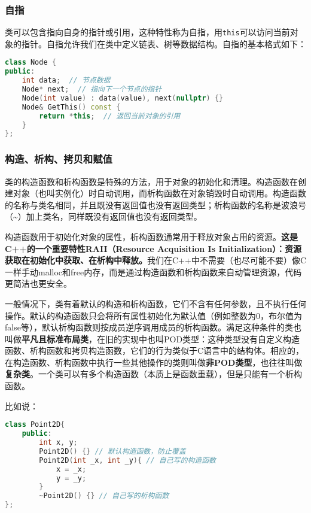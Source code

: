 \documentclass[../main.tex]{subfiles}
\begin{document}
\subsubsection{自指}

类可以包含指向自身的指针或引用，这种特性称为自指，用\texttt{this}可以访问当前对象的指针。自指允许我们在类中定义链表、树等数据结构。自指的基本格式如下：
\begin{lstlisting}[language=C++]
class Node {
public:
    int data;  // 节点数据
    Node* next;  // 指向下一个节点的指针
    Node(int value) : data(value), next(nullptr) {}
    Node& GetThis() const {
        return *this;  // 返回当前对象的引用
    }
};
\end{lstlisting}

\subsubsection{构造、析构、拷贝和赋值}

类的构造函数和析构函数是特殊的方法，用于对象的初始化和清理。构造函数在创建对象（也叫实例化）时自动调用，而析构函数在对象销毁时自动调用。构造函数的名称与类名相同，并且既没有返回值也没有返回类型；析构函数的名称是波浪号（\textasciitilde）加上类名，同样既没有返回值也没有返回类型。

构造函数用于初始化对象的属性，析构函数通常用于释放对象占用的资源。\textbf{这是C++的一个重要特性RAII（Resource Acquisition Is Initialization）：资源获取在初始化中获取、在析构中释放。}我们在C++中不需要（也尽可能不要）像C一样手动malloc和free内存，而是通过构造函数和析构函数来自动管理资源，代码更简洁也更安全。

一般情况下，类有着默认的构造和析构函数，它们不含有任何参数，且不执行任何操作。默认的构造函数只会将所有属性初始化为默认值（例如整数为0，布尔值为false等），默认析构函数则按成员逆序调用成员的析构函数。满足这种条件的类也叫做\textbf{平凡且标准布局类}，在旧的实现中也叫POD类型：这种类型没有自定义构造函数、析构函数和拷贝构造函数，它们的行为类似于C语言中的结构体。相应的，在构造函数、析构函数中执行一些其他操作的类则叫做\textbf{非POD类型}，也往往叫做\textbf{复杂类}。一个类可以有多个构造函数（本质上是函数重载），但是只能有一个析构函数。

比如说：
\begin{lstlisting}[language=C++]
class Point2D{
    public:
        int x, y;
        Point2D() {} // 默认构造函数，防止覆盖
        Point2D(int _x, int _y){ // 自己写的构造函数
            x = _x;
            y = _y;
        }
        ~Point2D() {} // 自己写的析构函数
};
\end{lstlisting}
\end{document}
